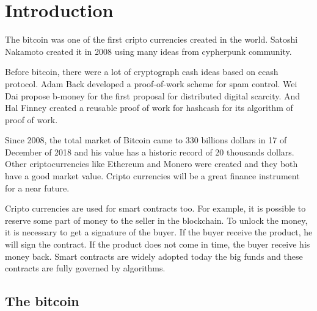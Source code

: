 \documentclass[12pt]{article}
\begin{document}
\section{Introduction}

The bitcoin \cite{nakamoto2008bitcoin} was one of the first cripto currencies created in the world.
Satoshi Nakamoto created it in 2008 using many ideas from cypherpunk community.

Before bitcoin, there were a lot of cryptograph cash ideas based on ecash protocol.
Adam Back developed a proof-of-work scheme for spam control.
Wei Dai propose b-money for the first proposal for distributed digital scarcity.
And Hal Finney created a reusable proof of work for hashcash for its algorithm of proof of work.

Since 2008, the total market of Bitcoin came to 330 billions dollars in 17 of December of 2018
and his value has a historic record of 20 thousands dollars.
Other criptocurrencies like Ethereum and Monero were created and they both have a good market value.
Cripto currencies will be a great finance instrument for a near future.

Cripto currencies are used for smart contracts too.
For example, it is possible to reserve some part of money to the seller in the blockchain.
To unlock the money, it is necessary to get a signature of the buyer.
If the buyer receive the product, he will sign the contract.
If the product does not come in time, the buyer receive his money back.
Smart contracts are widely adopted today the big funds and
these contracts are fully governed by algorithms.

\subsection{The bitcoin}

\end{document}
